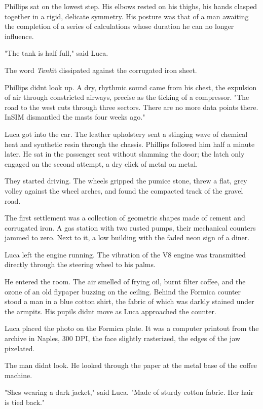 \documentclass[
  ngerman,
]{article}
\begin{document}
Phillips sat on the lowest step. His elbows rested on his thighs, his
hands clasped together in a rigid, delicate symmetry. His posture was
that of a man awaiting the completion of a series of calculations whose
duration he can no longer influence.

"The tank is half full," said Luca.

The word \emph{Tank}it dissipated against the corrugated iron sheet.

Phillips didn\textquotesingle t look up. A dry, rhythmic sound came from
his chest, the expulsion of air through constricted airways, precise as
the ticking of a compressor. "The road to the west cuts through three
sectors. There are no more data points there. InSIM dismantled the masts
four weeks ago."

Luca got into the car. The leather upholstery sent a stinging wave of
chemical heat and synthetic resin through the chassis. Phillips followed
him half a minute later. He sat in the passenger seat without slamming
the door; the latch only engaged on the second attempt, a dry click of
metal on metal.

They started driving. The wheels gripped the pumice stone, threw a flat,
grey volley against the wheel arches, and found the compacted track of
the gravel road.

The first settlement was a collection of geometric shapes made of cement
and corrugated iron. A gas station with two rusted pumps, their
mechanical counters jammed to zero. Next to it, a low building with the
faded neon sign of a diner.

Luca left the engine running. The vibration of the V8 engine was
transmitted directly through the steering wheel to his palms.

He entered the room. The air smelled of frying oil, burnt filter coffee,
and the ozone of an old flypaper buzzing on the ceiling. Behind the
Formica counter stood a man in a blue cotton shirt, the fabric of which
was darkly stained under the armpits. His pupils didn\textquotesingle t
move as Luca approached the counter.

Luca placed the photo on the Formica plate. It was a computer printout
from the archive in Naples, 300 DPI, the face slightly rasterized, the
edges of the jaw pixelated.

The man didn\textquotesingle t look. He looked through the paper at the
metal base of the coffee machine.

"She\textquotesingle s wearing a dark jacket," said Luca. "Made of
sturdy cotton fabric. Her hair is tied back."
\end{document}
